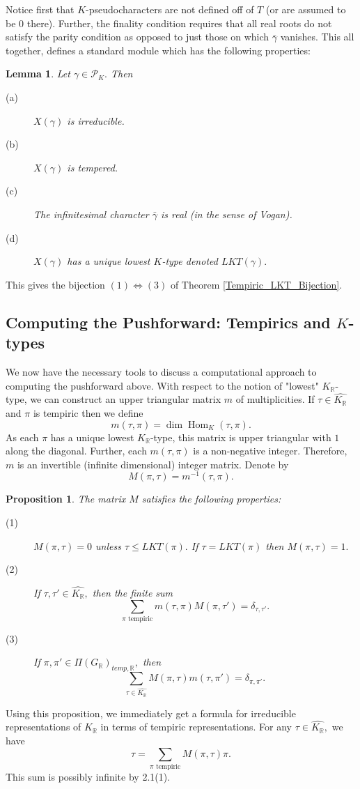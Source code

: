 \documentclass[letterpaper,twosided,11pt]{article}
\theoremstyle{plain}
\newtheorem{lemma}[theorem]{Lemma}
\newtheorem{proposition}[theorem]{Proposition}
\theoremstyle{definition}
\theoremstyle{remark}
\newcommand{\R}{\mathbb{R}}
\newcommand{\script}[1]{\mathscr{#1}}
\newcommand{\Hom}{\operatorname{Hom}}
\begin{document}
		 Notice first that $K$-pseudocharacters are not defined off of $T$ (or are assumed to be $0$ there). Further, the finality condition requires that all real roots do not satisfy the parity condition as opposed to just those on which $\bar{\gamma}$ vanishes. This all together, defines a standard module which has the following properties: 
		 \begin{lemma}\cite[Theorem 11.9]{Vogan2007} 
		 	Let $\gamma\in \script{P}_K.$ Then  \begin{description} 
				\item[(a)]  $X(\gamma)$ is irreducible. 
				\item[(b)] $X(\gamma)$ is tempered. 
				\item[(c)] The infinitesimal character $\bar{\gamma}$ is real (in the sense of Vogan). 
				\item[(d)] $X(\gamma)$ has a unique lowest $K$-type denoted $LKT(\gamma).$ 
			\end{description} 
		 \end{lemma} 
		 
		 This gives the bijection $(1)\iff (3)$ of Theorem \ref{Tempiric_LKT_Bijection}. 
		 
\subsection{Computing the Pushforward: Tempirics and $K$-types}
		 
	We now have the necessary tools to discuss a computational approach to computing the pushforward above. With respect to the notion of "lowest" $K_\R$-type, we can construct an upper triangular matrix $m$ of multiplicities. If $\tau\in \widehat{K_\R}$ and $\pi$ is tempiric then we define \[ m(\tau, \pi)=\dim \Hom_K(\tau,\pi).\]
	As each $\pi$ has a unique lowest $K_\R$-type, this matrix is upper triangular with $1$ along the diagonal. Further, each $m(\tau,\pi)$ is a non-negative integer. Therefore, $m$ is an invertible (infinite dimensional) integer matrix. Denote by \[ M(\pi,\tau)=m^{-1}(\tau,\pi). \]
	\begin{proposition}\cite{Vogan1981}  
		The matrix $M$ satisfies the following properties: 
		\begin{description} 
			\item[(1)] $M(\pi,\tau)=0$ unless $\tau\leq LKT(\pi).$ If $\tau=LKT(\pi)$ then $M(\pi,\tau)=1.$ 
			\item[(2)] If $\tau,\tau'\in \widehat{K_\R},$ then the finite sum \[ \sum_{\pi \text{ tempiric}} m(\tau, \pi)M(\pi,\tau')=\delta_{\tau,\tau'} .\] 
			\item[(3)] If $\pi,\pi'\in \Pi(G_\R)_{temp, \R},$ then \[ \sum_{\tau\in \widehat{K_\R}} M(\pi,\tau)m(\tau,\pi')=\delta_{\pi,\pi'}.\]   
		\end{description} 
	\end{proposition} 
		Using this proposition, we immediately get a formula for irreducible representations of $K_\R$ in terms of tempiric representations. For any $\tau\in \widehat{K_\R},$ we have \[ \tau=\sum_{\pi \text{ tempiric}} M(\pi,\tau)\pi .\]
	This sum is possibly infinite by 2.1(1).  
	
\end{document}
